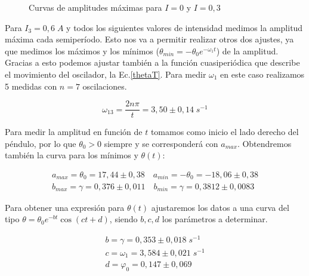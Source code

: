 \documentclass[a4paper,12pt,titlepage]{article}
\begin{document}
\begin{figure}[h!]
\begin{subfigure}{0.45\textwidth}
    \end{subfigure}
    \caption{Curvas de amplitudes máximas para $I=0$ y $I=0,3$}
\end{figure}

Para $I_3=0,6\;A$ y todos los siguientes valores de intensidad medimos la amplitud máxima cada semiperíodo. Esto nos va a permitir realizar otros dos ajustes, ya que medimos los máximos y los mínimos ($\theta_{min}=-\theta_0e^{-\omega_1t}$) de la amplitud. Gracias a esto podemos ajustar también a la función cuasiperiódica que describe el movimiento del oscilador, la Ec.\ref{thetaT}. Para medir $\omega_1$ en este caso realizamos 5 medidas con $n=7$ oscilaciones.

\begin{equation}
    \omega_{13} = \frac{2n\pi}{t} = 3,50 \pm 0,14\; s^{-1}
\end{equation}

Para medir la amplitud en función de $t$ tomamos como inicio el lado derecho del péndulo, por lo que $\theta_0>0$ siempre y se corresponderá con $a_{max}$. Obtendremos también la curva para los mínimos y $\theta(t)$:

\begin{equation}
    \begin{gathered}
        a_{max} = \theta_0 = 17,44 \pm 0,38 \quad a_{min} = -\theta_0 = -18,06 \pm 0,38\\
        b_{max} = \gamma =0,376\pm 0,011 \quad b_{min} = \gamma = 0,3812 \pm 0,0083
    \end{gathered}
\end{equation}

Para obtener una expresión para $\theta(t)$ ajustaremos los datos a una curva del tipo \newline $\theta = \theta_0 e^{-bt}\cos(ct+d)$, siendo ${b,c,d}$ los parámetros a determinar.

\begin{equation}
    \begin{gathered}
        b = \gamma = 0,353\pm 0,018 \;s^{-1}\\
        c = \omega_1 = 3,584\pm 0,021 \; s^{-1}\\
        d = \varphi_0 = 0,147 \pm 0,069 
    \end{gathered}
\end{equation}
\end{document}

